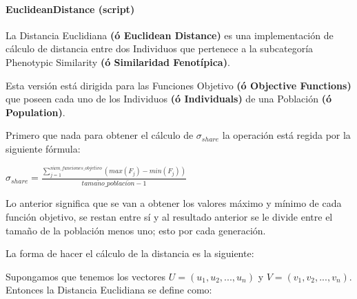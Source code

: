 \documentclass[letterpaper,10pt,english]{sphinxmanual}
\begin{document}
\paragraph{EuclideanDistance (script)}
\label{Model/SharingFunction/PhenotypicSimilarity/EuclideanDistance:euclideandistance-script}\label{Model/SharingFunction/PhenotypicSimilarity/EuclideanDistance::doc}
\begin{DUlineblock}{0em}
\item[] La Distancia Euclidiana \textbf{(ó Euclidean Distance)} es una implementación
de cálculo de distancia entre dos Individuos que pertenece a la subcategoría
Phenotypic Similarity \textbf{(ó Similaridad Fenotípica)}.
\item[] Esta versión está dirigida para las Funciones Objetivo \textbf{(ó Objective Functions)}
que poseen cada uno de los Individuos \textbf{(ó Individuals)} de una Población \textbf{(ó Population)}.
\item[] 
\item[] Primero que nada para obtener el cálculo de \(\sigma_{share}\) la operación está regida por la siguiente
fórmula:
\end{DUlineblock}

\begin{center}\(\sigma_{share} = \frac{\sum_{j=1}^{n\acute{u}m\_funciones\_objetivo}(max(F_j) - min(F_j))}{tama\tilde{n}o\_poblaci\acute{o}n - 1}\)
\end{center}
\begin{DUlineblock}{0em}
\item[] Lo anterior significa que se van a obtener los valores máximo y mínimo de cada función objetivo,
se restan entre sí y al resultado anterior se le divide entre el tamaño de la población menos uno; esto por cada generación.
\item[] 
\item[] La forma de hacer el cálculo de la distancia es la siguiente:
\item[] Supongamos que tenemos los vectores \(U = (u_1,u_2,...,u_n)\) y \(V = (v_1,v_2,...,v_n)\). Entonces la Distancia Euclidiana se define como:
\end{DUlineblock}
\end{document}
